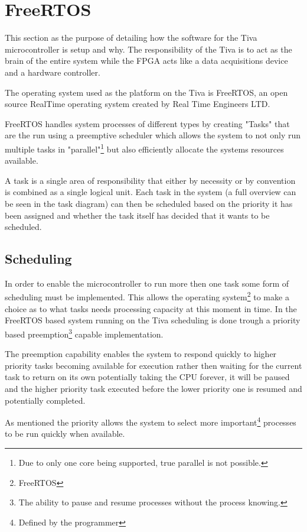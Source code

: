 \documentclass[../../../main]{subfiles}
\begin{document}
\section{FreeRTOS}

This section as the purpose of detailing how the software for the Tiva microcontroller is setup and why. The responsibility of the Tiva is to act as the brain of the entire system while the FPGA acts like a data acquisitions device and a hardware controller. 

The operating system used as the platform on the Tiva is FreeRTOS, an open source RealTime operating system created by Real Time Engineers LTD.

FreeRTOS handles system processes of different types by creating "Tasks" that are the run using a preemptive scheduler which allows the system to not only run multiple tasks in "parallel"\footnote{Due to only one core being supported, true parallel is not possible.} but also efficiently allocate the systems resources available.


A task is a single area of responsibility that either by necessity or by convention is combined as a single logical unit. Each task in the system (a full overview can be seen in the task diagram) can then be scheduled based on the priority it has been assigned and whether the task itself has decided that it wants to be scheduled. 

\subsection{Scheduling}

In order to enable the microcontroller to run more then one task some form of scheduling must be implemented. This allows the operating system\footnote{FreeRTOS} to make a choice as to what tasks needs processing capacity at this moment in time. In the FreeRTOS based system running on the Tiva scheduling is done trough a priority based preemption\footnote{The ability to pause and resume processes without the process knowing.} capable implementation.

The preemption capability enables the system to respond quickly to higher priority tasks becoming available for execution rather then waiting for the current task to return on its own potentially taking the CPU forever, it will be paused and the higher priority task executed before the lower priority one is resumed and potentially completed.
 
As mentioned the priority allows the system to select more important\footnote{Defined by the programmer} processes to be run quickly when available.  
\end{document}
